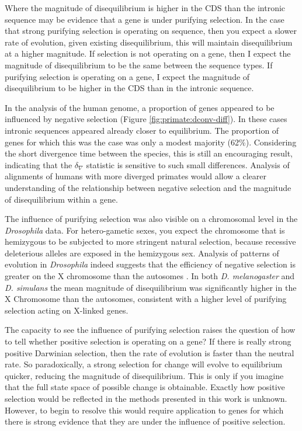 Where the magnitude of disequilibrium is higher in the CDS than the intronic sequence may be evidence that a gene is under purifying selection. In the case that strong purifying selection is operating on sequence, then you expect a slower rate of evolution, given existing disequilibrium, this will maintain disequilibrium at a higher magnitude.  If selection is not operating on a gene, then I expect the magnitude of disequilibrium to be the same between the sequence types. If purifying selection is operating on a gene, I expect the magnitude of disequilibrium to be higher in the CDS than in the intronic sequence.  

In the analysis of the human genome, a proportion of genes appeared to be influenced by negative selection (Figure \ref{fig:primate:dconv-diff}). In these cases intronic sequences appeared already closer to equilibrium. The proportion of genes for which this was the case was only a modest majority (62\%). Considering the short divergence time between the species, this is still an encouraging result, indicating that the $\delta_\nabla$ statistic is sensitive to such small differences. Analysis of alignments of humans with more diverged primates would allow a clearer understanding of the relationship between negative selection and the magnitude of disequilibrium within a gene. 

The influence of purifying selection was also visible on a chromosomal level in the \textit{Drosophila} data. For hetero-gametic sexes, you expect the chromosome that is hemizygous to be subjected to more stringent natural selection, because recessive deleterious alleles are exposed in the hemizygous sex. Analysis of patterns of evolution in \textit{Drosophila} indeed suggests that the efficiency of negative selection is greater on the X chromosome than the autosomes \citep{Singh2008ContrastingDrosophila}. In both \textit{D. melanogaster} and \textit{D. simulans} the mean magnitude of disequilibrium was significantly higher in the X Chromosome than the autosomes, consistent with a higher level of purifying selection acting on X-linked genes. 

The capacity to see the influence of purifying selection raises the question of how to tell whether positive selection is operating on a gene? If there is really strong positive Darwinian selection, then the rate of evolution is faster than the neutral rate. So paradoxically, a strong selection for change will evolve to equilibrium quicker, reducing the magnitude of disequilibrium. This is only if you imagine that the full state space of possible change is obtainable. Exactly how positive selection would be reflected in the methods presented in this work is unknown. However, to begin to resolve this would require application to genes for which there is strong evidence that they are under the influence of positive selection. 

